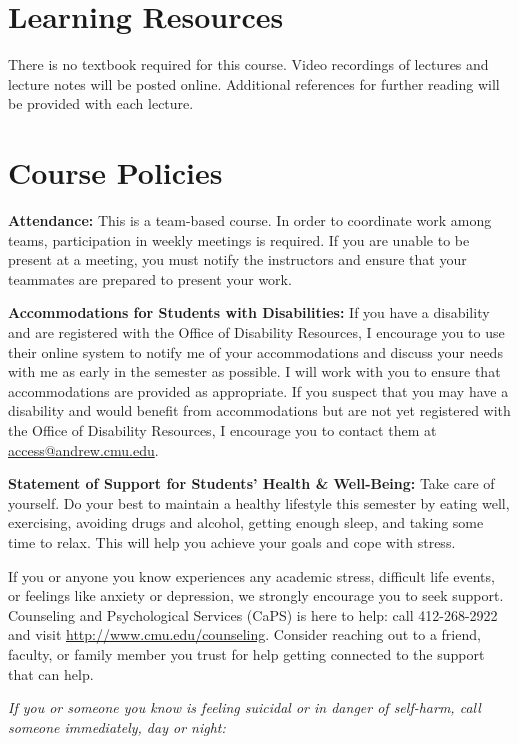 \documentclass[11pt,letterpaper]{article}
\begin{document}
\section*{Learning Resources}

There is no textbook required for this course. Video recordings of lectures and lecture notes will be posted online. Additional references for further reading will be provided with each lecture.

\section*{Course Policies}

\textbf{Attendance:} This is a team-based course. In order to coordinate work among teams, participation in weekly meetings is required. If you are unable to be present at a meeting, you must notify the instructors and ensure that your teammates are prepared to present your work.

\medskip
\noindent
\textbf{Accommodations for Students with Disabilities:} If you have a disability and are registered with the Office of Disability Resources, I encourage you to use their online system to notify me of your accommodations and discuss your needs with me as early in the semester as possible. I will work with you to ensure that accommodations are provided as appropriate. If you suspect that you may have a disability and would benefit from accommodations but are not yet registered with the Office of Disability Resources, I encourage you to contact them at \href{mailto:access@andrew.cmu.edu}{access@andrew.cmu.edu}.

\medskip
\noindent
\textbf{Statement of Support for Students' Health \& Well-Being:} Take care of yourself. Do your best to maintain a healthy lifestyle this semester by eating well, exercising, avoiding drugs and alcohol, getting enough sleep, and taking some time to relax. This will help you achieve your goals and cope with stress.

\medskip
\noindent
If you or anyone you know experiences any academic stress, difficult life events, or feelings like anxiety or depression, we strongly encourage you to seek support. Counseling and Psychological Services (CaPS) is here to help: call 412-268-2922 and visit \href{http://www.cmu.edu/counseling}{http://www.cmu.edu/counseling}. Consider reaching out to a friend, faculty, or family member you trust for help getting connected to the support that can help.

\medskip
\noindent
\textit{If you or someone you know is feeling suicidal or in danger of self-harm, call someone immediately, day or night:}
\end{document}
